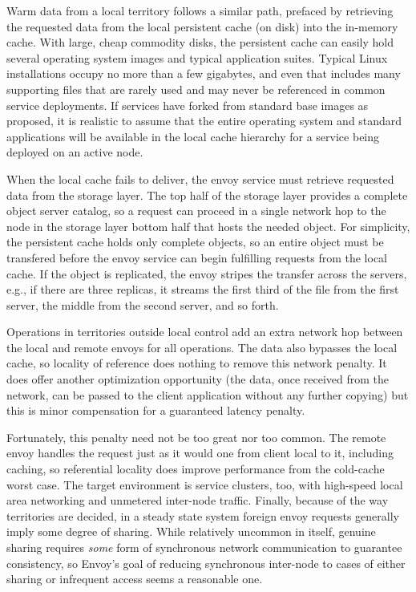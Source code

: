 Warm data from a local territory follows a similar path, prefaced by retrieving the requested data from the local persistent cache (on disk) into the in-memory cache. With large, cheap commodity disks, the persistent cache can easily hold several operating system images and typical application suites. Typical Linux installations occupy no more than a few gigabytes, and even that includes many supporting files that are rarely used and may never be referenced in common service deployments. If services have forked from standard base images as proposed, it is realistic to assume that the entire operating system and standard applications will be available in the local cache hierarchy for a service being deployed on an active node.

When the local cache fails to deliver, the envoy service must retrieve requested data from the storage layer. The top half of the storage layer provides a complete object server catalog, so a request can proceed in a single network hop to the node in the storage layer bottom half that hosts the needed object. For simplicity, the persistent cache holds only complete objects, so an entire object must be transfered before the envoy service can begin fulfilling requests from the local cache. If the object is replicated, the envoy stripes the transfer across the servers, e.g., if there are three replicas, it streams the first third of the file from the first server, the middle from the second server, and so forth.

Operations in territories outside local control add an extra network hop between the local and remote envoys for all operations. The data also bypasses the local cache, so locality of reference does nothing to remove this network penalty. It does offer another optimization opportunity (the data, once received from the network, can be passed to the client application without any further copying) but this is minor compensation for a guaranteed latency penalty.

Fortunately, this penalty need not be too great nor too common. The remote envoy handles the request just as it would one from client local to it, including caching, so referential locality does improve performance from the cold-cache worst case. The target environment is service clusters, too, with high-speed local area networking and unmetered inter-node traffic. Finally, because of the way territories are decided, in a steady state system foreign envoy requests generally imply some degree of sharing. While relatively uncommon in itself, genuine sharing requires \emph{some} form of synchronous network communication to guarantee consistency, so Envoy's goal of reducing synchronous inter-node to cases of either sharing or infrequent access seems a reasonable one.

